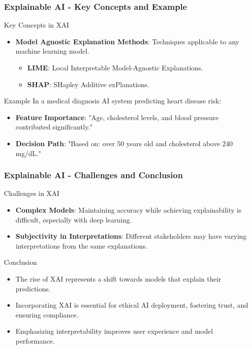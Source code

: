 \documentclass{beamer}
\begin{document}
\begin{frame}[fragile]
    \frametitle{Explainable AI - Key Concepts and Example}
    \begin{block}{Key Concepts in XAI}
        \begin{itemize}
            \item \textbf{Model Agnostic Explanation Methods}: Techniques applicable to any machine learning model.
                \begin{itemize}
                    \item \textbf{LIME}: Local Interpretable Model-Agnostic Explanations.
                    \item \textbf{SHAP}: SHapley Additive exPlanations.
                \end{itemize}
        \end{itemize}
    \end{block}
    \begin{block}{Example}
        In a medical diagnosis AI system predicting heart disease risk:
        \begin{itemize}
            \item \textbf{Feature Importance}: "Age, cholesterol levels, and blood pressure contributed significantly."
            \item \textbf{Decision Path}: "Based on: over 50 years old and cholesterol above 240 mg/dL."
        \end{itemize}
    \end{block}
\end{frame}

\begin{frame}[fragile]
    \frametitle{Explainable AI - Challenges and Conclusion}
    \begin{block}{Challenges in XAI}
        \begin{itemize}
            \item \textbf{Complex Models}: Maintaining accuracy while achieving explainability is difficult, especially with deep learning.
            \item \textbf{Subjectivity in Interpretations}: Different stakeholders may have varying interpretations from the same explanations.
        \end{itemize}
    \end{block}
    \begin{block}{Conclusion}
        \begin{itemize}
            \item The rise of XAI represents a shift towards models that explain their predictions.
            \item Incorporating XAI is essential for ethical AI deployment, fostering trust, and ensuring compliance.
            \item Emphasizing interpretability improves user experience and model performance.
        \end{itemize}
    \end{block}
\end{frame}
\end{document}
